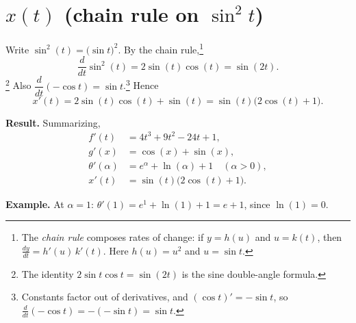 \documentclass[11pt]{article}
\newcommand{\resultbox}[1]{%
  \begin{savenotes}%
  \begingroup\setlength{\fboxsep}{10pt}\noindent
  \colorbox{purple!8}{\parbox{\dimexpr\linewidth-2\fboxsep\relax}{\textbf{Result. }#1}}
  \endgroup
  \end{savenotes}%
}
\newcommand{\examplebox}[1]{%
  \begin{savenotes}%
  \begingroup\setlength{\fboxsep}{10pt}\noindent
  \colorbox{green!8}{\parbox{\dimexpr\linewidth-2\fboxsep\relax}{\textbf{Example. }#1}}
  \endgroup
  \end{savenotes}%
}
\begin{document}
\section*{\(x(t)\) (chain rule on \(\sin^2 t\))}
Write \(\sin^2(t) = \bigl(\sin t\bigr)^2\). By the chain rule,\footnote{The
\emph{chain rule} composes rates of change: if \(y=h(u)\) and \(u=k(t)\), then
\(\frac{dy}{dt}=h'(u)\,k'(t)\). Here \(h(u)=u^2\) and \(u=\sin t\).}
\[
\frac{d}{dt}\sin^2(t) = 2\sin(t)\cos(t) = \sin(2t).
\]\footnote{The identity \(2\sin t\cos t=\sin(2t)\) is the sine double-angle formula.}
Also \(\dfrac{d}{dt}(-\cos t)=\sin t\).\footnote{Constants factor out of
derivatives, and \((\cos t)'=-\sin t\), so \(\frac{d}{dt}(-\cos t)=-(-\sin t)=\sin t\).}
Hence
\[
x'(t) = 2\sin(t)\cos(t) + \sin(t)
= \sin(t)\bigl(2\cos(t)+1\bigr).
\]

\resultbox{Summarizing,
\[
\begin{aligned}
f'(t) &= 4t^3 + 9t^2 - 24t + 1,\\
g'(x) &= \cos(x) + \sin(x),\\
\theta'(\alpha) &= e^\alpha + \ln(\alpha) + 1 \quad (\alpha>0),\\
x'(t) &= \sin(t)\bigl(2\cos(t)+1\bigr).
\end{aligned}
\]}

\examplebox{At \(\alpha=1\): \(\theta'(1)=e^1+\ln(1)+1=e+1\), since \(\ln(1)=0\).}
\end{document}
